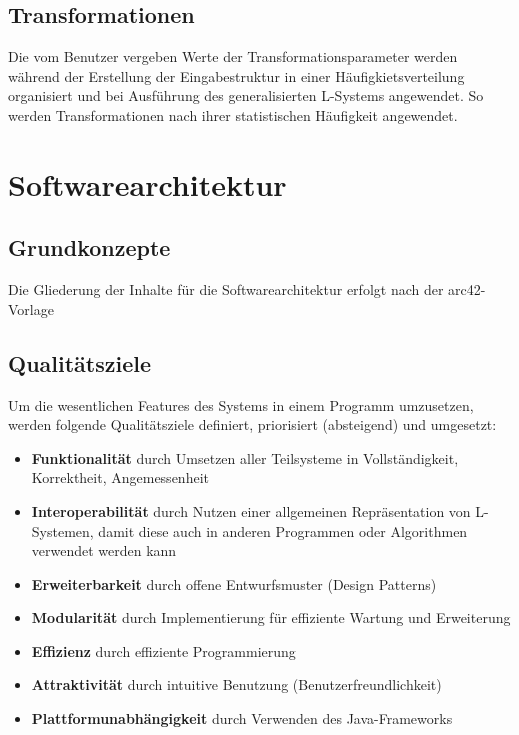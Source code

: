 \subsection*{Transformationen}
Die vom Benutzer vergeben Werte der Transformationsparameter werden während der Erstellung der Eingabestruktur in
einer Häufigkietsverteilung organisiert und bei Ausführung des generalisierten L-Systems angewendet.
So werden Transformationen nach ihrer statistischen Häufigkeit angewendet.

\section{Softwarearchitektur}

\subsection{Grundkonzepte}
Die Gliederung der Inhalte für die Softwarearchitektur erfolgt nach der arc42-Vorlage~\cite{arc42}

\subsection*{Qualitätsziele}
Um die wesentlichen Features des Systems in einem Programm umzusetzen, werden folgende Qualitätsziele definiert,
priorisiert (absteigend) und umgesetzt:
\begin{itemize}
    \item \textbf{Funktionalität} durch Umsetzen aller Teilsysteme in Vollständigkeit, Korrektheit, Angemessenheit
    \item \textbf{Interoperabilität} durch Nutzen einer allgemeinen Repräsentation von L-Systemen, damit diese
    auch in anderen Programmen oder Algorithmen verwendet werden kann
    \item \textbf{Erweiterbarkeit} durch offene Entwurfsmuster (Design Patterns)
    \item \textbf{Modularität} durch Implementierung für effiziente Wartung und Erweiterung
    \item \textbf{Effizienz} durch effiziente Programmierung
    \item \textbf{Attraktivität} durch intuitive Benutzung (Benutzerfreundlichkeit)
    \item \textbf{Plattformunabhängigkeit} durch Verwenden des Java-Frameworks
\end{itemize}


